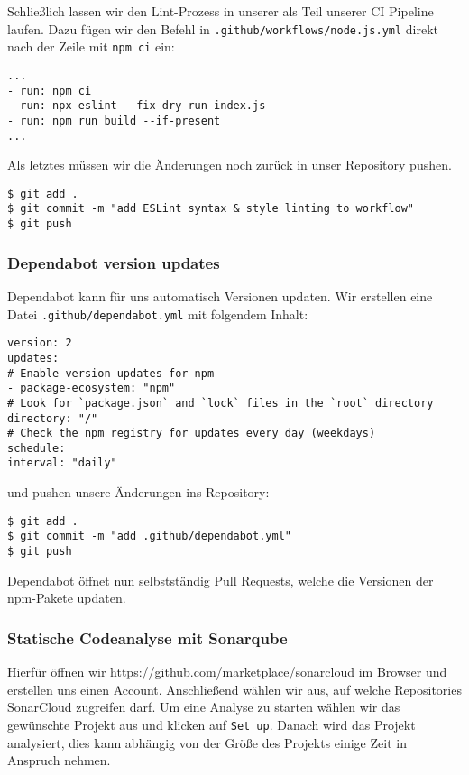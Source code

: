 \noindent
Schließlich lassen wir den Lint-Prozess in unserer
als Teil unserer CI Pipeline laufen.
Dazu fügen wir den Befehl in \verb|.github/workflows/node.js.yml|
direkt nach der Zeile mit \verb|npm ci| ein:

\begin{verbatim}
...
- run: npm ci
- run: npx eslint --fix-dry-run index.js
- run: npm run build --if-present
...
\end{verbatim}

\noindent
Als letztes müssen wir die Änderungen noch zurück in unser
Repository pushen.

\begin{verbatim}
$ git add .
$ git commit -m "add ESLint syntax & style linting to workflow"
$ git push
\end{verbatim}


\subsubsection{Dependabot version updates}
Dependabot kann für uns automatisch Versionen updaten.
Wir erstellen eine Datei \verb|.github/dependabot.yml| 
mit folgendem Inhalt:

\begin{verbatim}
version: 2
updates:
# Enable version updates for npm
- package-ecosystem: "npm"
# Look for `package.json` and `lock` files in the `root` directory
directory: "/"
# Check the npm registry for updates every day (weekdays)
schedule:
interval: "daily"
\end{verbatim}

\noindent
und pushen unsere Änderungen ins Repository:

\begin{verbatim}
$ git add .
$ git commit -m "add .github/dependabot.yml"
$ git push
\end{verbatim}

\noindent
Dependabot öffnet nun selbstständig Pull Requests,
welche die Versionen der npm-Pakete updaten.

\subsubsection{Statische Codeanalyse mit Sonarqube}
Hierfür öffnen wir \url{https://github.com/marketplace/sonarcloud}
im Browser und erstellen uns einen Account.
Anschließend wählen wir aus, auf welche Repositories
SonarCloud zugreifen darf.
Um eine Analyse zu starten wählen wir das gewünschte Projekt aus 
und klicken auf \verb|Set up|.
Danach wird das Projekt analysiert, dies kann abhängig von der Größe des Projekts einige Zeit in
Anspruch nehmen. \\

